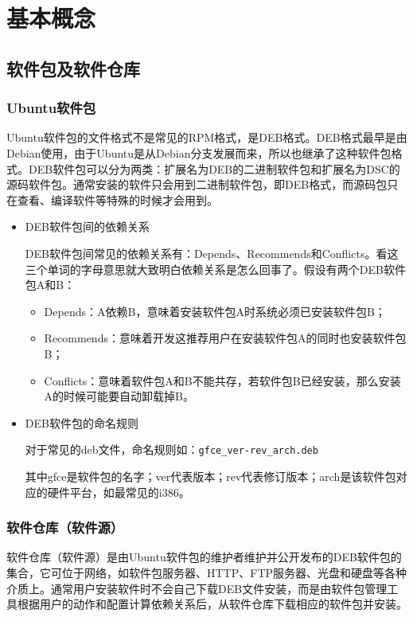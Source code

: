 \chapter{基本概念}
\section{软件包及软件仓库}
\subsection{Ubuntu软件包}
Ubuntu软件包的文件格式不是常见的RPM格式，是DEB格式。DEB格式最早是由Debian使用，由于Ubuntu是从Debian分支发展而来，所以也继承了这种软件包格式。DEB软件包可以分为两类：扩展名为DEB的二进制软件包和扩展名为DSC的源码软件包。通常安装的软件只会用到二进制软件包，即DEB格式，而源码包只在查看、编译软件等特殊的时候才会用到。

\begin{itemize}
\item DEB软件包间的依赖关系

DEB软件包间常见的依赖关系有：Depends、Recommends和Conflicts。看这三个单词的字母意思就大致明白依赖关系是怎么回事了。假设有两个DEB软件包A和B：
\begin{itemize}
\item Depends：A依赖B，意味着安装软件包A时系统必须已安装软件包B；
\item Recommends：意味着开发这推荐用户在安装软件包A的同时也安装软件包B；
\item Conflicts：意味着软件包A和B不能共存，若软件包B已经安装，那么安装A的时候可能要自动卸载掉B。
\end{itemize}

\item DEB软件包的命名规则

对于常见的deb文件，命名规则如：\verb|gfce_ver-rev_arch.deb|

其中gfce是软件包的名字；ver代表版本；rev代表修订版本；arch是该软件包对应的硬件平台，如最常见的i386。
\end{itemize}


\subsection{软件仓库（软件源）}
软件仓库（软件源）是由Ubuntu软件包的维护者维护并公开发布的DEB软件包的集合，它可位于网络，如软件包服务器、HTTP、FTP服务器、光盘和硬盘等各种介质上。通常用户安装软件时不会自己下载DEB文件安装，而是由软件包管理工具根据用户的动作和配置计算依赖关系后，从软件仓库下载相应的软件包并安装。

